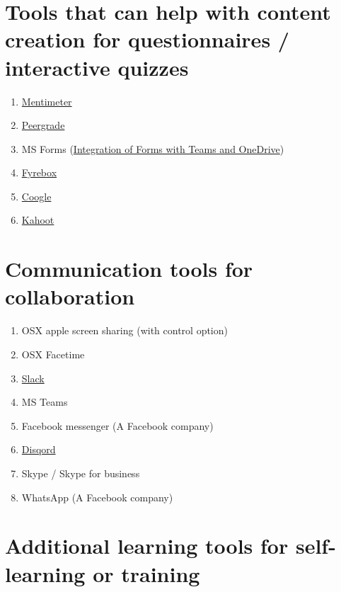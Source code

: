\documentclass[
]{book}
\providecommand{\tightlist}{%
  \setlength{\itemsep}{0pt}\setlength{\parskip}{0pt}}
\begin{document}
\hypertarget{tools-that-can-help-with-content-creation-for-questionnaires-interactive-quizzes}{%
\section{Tools that can help with content creation for questionnaires / interactive quizzes}\label{tools-that-can-help-with-content-creation-for-questionnaires-interactive-quizzes}}

\begin{enumerate}
\def\labelenumi{\arabic{enumi}.}
\tightlist
\item
  \href{https://www.mentimeter.com}{Mentimeter}
\item
  \url{Peergrade}
\item
  MS Forms (\href{https://www.loom.com/share/ed2fd65abfd64189b2c81f8daff7ec79}{Integration of Forms with Teams and OneDrive})
\item
  \href{https://www.fyrebox.com}{Fyrebox}
\item
  \href{https://coggle.it}{Coogle}
\item
  \url{Kahoot}
\end{enumerate}

\hypertarget{communication-tools-for-collaboration}{%
\section{Communication tools for collaboration}\label{communication-tools-for-collaboration}}

\begin{enumerate}
\def\labelenumi{\arabic{enumi}.}
\tightlist
\item
  OSX apple screen sharing (with control option)
\item
  OSX Facetime
\item
  \href{https://slack.com/intl/en-dk/}{Slack}
\item
  MS Teams
\item
  Facebook messenger (A Facebook company)
\item
  \href{https://discord.com/brand-new}{Disqord}
\item
  Skype / Skype for business
\item
  WhatsApp (A Facebook company)
\end{enumerate}

\hypertarget{additional-learning-tools-for-self-learning-or-training}{%
\section{Additional learning tools for self-learning or training}\label{additional-learning-tools-for-self-learning-or-training}}
\end{document}
